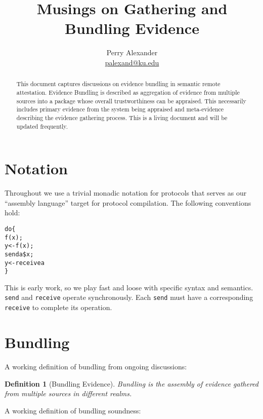 \documentclass[10pt]{article}
\title{Musings on Gathering and Bundling Evidence}
\author{Perry Alexander \\
 \url{palexand@ku.edu}}
\newtheorem{definition}{Definition}
\begin{document}
\maketitle

\begin{abstract}
  This document captures discussions on evidence bundling in semantic
  remote attestation.  Evidence Bundling is described as aggregation
  of evidence from multiple sources into a package whose overall
  trustworthiness can be appraised.  This necessarily includes primary
  evidence from the system being appraised and meta-evidence
  describing the evidence gathering process.  This is a living
  document and will be updated frequently.
\end{abstract}

\section*{Notation}

Throughout we use a trivial monadic notation for protocols that serves
as our ``assembly language'' target for protocol compilation.
The following conventions hold:

\begin{alltt}
  do \{                % evaluate functions in sequence
       f(x);          % calculate f(x) and discard the result
       y <- f(x);     % calculate f(x) and bind the result to y
       send a \$ x;    % evaluate x and send the result to a
       y <- receive a % receive data from a and the result to y
  \}
\end{alltt}

This is early work, so we play fast and loose with specific syntax and
semantics.  \Verb+send+ and \Verb+receive+ operate synchronously.
Each \Verb+send+ must have a corresponding \Verb+receive+ to complete
its operation.

\section*{Bundling}

A working definition of bundling from ongoing discussions:

\begin{definition}[Bundling Evidence]
  Bundling is the assembly of evidence gathered from multiple sources
  in different realms.
\end{definition}

A working definition of bundling soundness:
\end{document}
